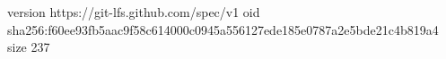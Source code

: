 version https://git-lfs.github.com/spec/v1
oid sha256:f60ee93fb5aac9f58c614000c0945a556127ede185e0787a2e5bde21c4b819a4
size 237
